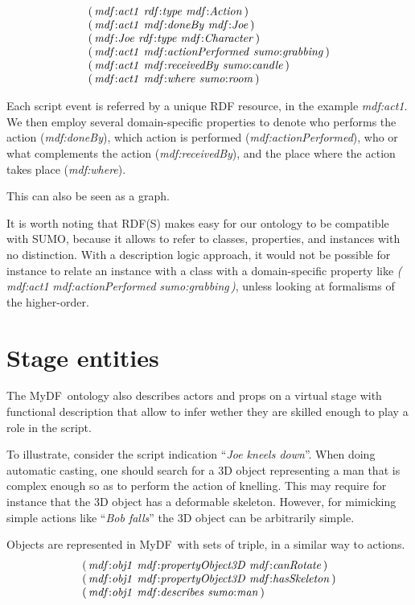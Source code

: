 \documentclass[a4paper,UKenglish]{oasics}
\newcommand{\mydf}{MyDF}
\newcommand{\ns}{mdf{:}}
\newcommand{\triple}[3]{{\it(\,#1\,\,#2\,\,#3\,)}}
\begin{document}
$$
\begin{array}{l}
\triple{\ns act1}{rdf{:}type}{\ns Action}
\\
\triple{\ns act1}{\ns doneBy}{\ns Joe}
\\
\triple{\ns Joe}{rdf{:}type}{\ns Character}
\\
\triple{\ns act1}{\ns actionPerformed}{sumo{:}grabbing}
\\
\triple{\ns act1}{\ns receivedBy}{sumo{:}candle}
\\
\triple{\ns act1}{\ns where}{sumo{:}room}
\end{array}
$$


\smallskip
Each script event is referred by a unique RDF resource, in the example \emph{\ns act1}.
We then employ several domain-specific properties to denote
who performs the action (\emph{\ns doneBy}),
which action is performed (\emph{\ns actionPerformed}), 
who or what complements the action (\emph{\ns receivedBy}),
and the place where the action takes place (\emph{\ns where}).

This can also be seen as a graph.



\smallskip
It is worth noting that RDF(S) makes easy for our ontology to be compatible with SUMO,   because it allows to refer to classes, properties, and instances with no distinction. With a  description logic approach, it would not be possible for instance to relate an instance with a class with a domain-specific property  like 
\triple{\ns act1}{\ns actionPerformed}{sumo{:}grabbing},
 unless looking at formalisms of the higher-order.


\section{Stage entities}
The \mydf\ ontology also describes actors and props on a virtual stage
with functional description that allow to infer wether they are skilled enough to play a role in the script. 

To illustrate, consider the script indication 
``\emph{Joe kneels down}''.
When doing automatic casting, one should search for a 3D object representing a man that  is complex enough so as to perform the action of knelling.
This may require for instance that the 3D object has a deformable skeleton.
However, for mimicking simple actions like ``\emph{Bob falls}'' the 3D object can be arbitrarily simple.

\smallskip
Objects are represented in \mydf\ with sets of triple, in a similar way to actions.
$$
\begin{array}{l}
\triple{\ns obj1}{\ns propertyObject3D}{\ns canRotate}
\\
\triple{\ns obj1}{\ns propertyObject3D}{\ns hasSkeleton}
\\
\triple{\ns obj1}{\ns describes}{sumo{:}man}\end{array}
$$
\end{document}
